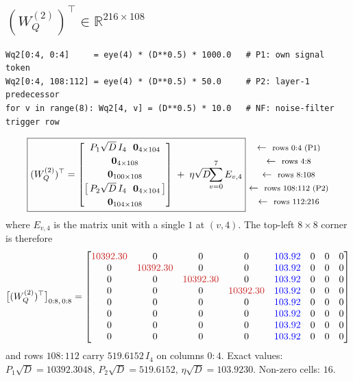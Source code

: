 \documentclass[11pt]{article}
\newcommand{\R}{\mathbb{R}}
\newcommand{\Wq}{W_Q}
\newcommand{\sd}{\sqrt{D}}
\newcommand{\rowlab}[1]{\ \leftarrow\ \text{\footnotesize #1}}
\begin{document}
\subsection{$(\Wq^{(2)})^\top\in\R^{216\times108}$}
\begin{lstlisting}
Wq2[0:4, 0:4]     = eye(4) * (D**0.5) * 1000.0   # P1: own signal token
Wq2[0:4, 108:112] = eye(4) * (D**0.5) * 50.0     # P2: layer-1 predecessor
for v in range(8): Wq2[4, v] = (D**0.5) * 10.0   # NF: noise-filter trigger row
\end{lstlisting}
\begin{equation}
\boxed{
(\Wq^{(2)})^\top=
\begin{bmatrix}
P_1\sd\,I_4\ \ \bm{0}_{4\times104}\\[2pt]
\bm{0}_{4\times108}\\[2pt]
\bm{0}_{100\times108}\\[2pt]
\bigl[\,P_2\sd\,I_4\ \ \bm{0}_{4\times104}\,\bigr]\\[2pt]
\bm{0}_{104\times108}
\end{bmatrix}
\;+\;\eta\sd\!\!\sum_{v=0}^{7} E_{v,4}}
\begin{matrix}
\rowlab{rows $0{:}4$ (P1)}\\[2pt]
\rowlab{rows $4{:}8$}\\[2pt]
\rowlab{rows $8{:}108$}\\[2pt]
\rowlab{rows $108{:}112$ (P2)}\\[2pt]
\rowlab{rows $112{:}216$}
\end{matrix}
\end{equation}
where $E_{v,4}$ is the matrix unit with a single $1$ at $(v,4)$. The top-left $8\times8$ corner is
therefore
\begin{equation}
\bigl[(\Wq^{(2)})^\top\bigr]_{0:8,\,0:8}=
\begin{bmatrix}
\textcolor{hl}{10392.30}&0&0&0&\textcolor{blue}{103.92}&0&0&0\\
0&\textcolor{hl}{10392.30}&0&0&\textcolor{blue}{103.92}&0&0&0\\
0&0&\textcolor{hl}{10392.30}&0&\textcolor{blue}{103.92}&0&0&0\\
0&0&0&\textcolor{hl}{10392.30}&\textcolor{blue}{103.92}&0&0&0\\
0&0&0&0&\textcolor{blue}{103.92}&0&0&0\\
0&0&0&0&\textcolor{blue}{103.92}&0&0&0\\
0&0&0&0&\textcolor{blue}{103.92}&0&0&0\\
0&0&0&0&\textcolor{blue}{103.92}&0&0&0
\end{bmatrix}
\end{equation}
and rows $108{:}112$ carry $519.6152\,I_4$ on columns $0{:}4$. Exact values:
$P_1\sd=10392.3048$, $P_2\sd=519.6152$, $\eta\sd=103.9230$. Non-zero cells: $16$.
\end{document}
